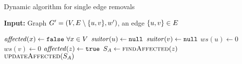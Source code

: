 \begin{algorithm}[t]
\caption{Dynamic \suitor algorithm for single edge removals}
\label{algo:dyn-suitor-single-rem}
\textbf{Input:} Graph $G' = (V, E\setminus \set{u, v}, w')$, an edge $\set{u, v} \in E$

\begin{algorithmic}[1]
\label{line:dyn-suitor-rem:rem-condition}
\State$\mathit{affected}(x) \gets \texttt{false}\ \forall x \in V$
\State$\mathit{suitor}(u) \gets \texttt{null}$\label{line:dyn-suitor-rem:inv-1}
\State$\mathit{suitor}(v) \gets \texttt{null}$
\State$ws(u) \gets 0$
\State$ws(v) \gets 0$\label{line:dyn-suitor-rem:inv-2}
\State$\mathit{affected}(z) \gets \texttt{true}$
\State$S_A \gets \textsc{findAffected}(z)$
\State$\textsc{updateAffected}(S_A)$
\EndFor
\EndIf
\end{algorithmic}
\end{algorithm}
